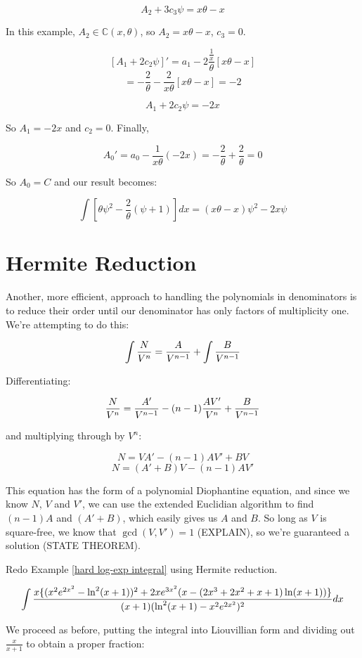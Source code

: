 $$A_2 + 3 c_3 \psi = x\theta - x$$

In this example, $A_2 \in {\mathbb C}(x,\theta)$, so $A_2 = x\theta -x$, $c_3=0$.

$$\left[ A_1 + 2 c_2 \psi \right]' = a_1 - 2 \frac{\frac{1}{x}}{\theta}[x\theta - x]$$
$$= -\frac{2}{\theta} - \frac{2}{x \theta}[x\theta - x] = -2$$

$$A_1 + 2 c_2 \psi = -2x$$

So $A_1 = -2x$ and $c_2 = 0$.  Finally,

$$A_0' = a_0 - \frac{1}{x \theta}(-2x) = -\frac{2}{\theta} + \frac{2}{\theta} = 0$$

So $A_0 = C$ and our result becomes:

$$\int \left[ \theta \psi^2 - \frac{2}{\theta}(\psi+1) \right] dx = (x\theta -x)\psi^2 - 2x \psi$$


\endexample

\vfill\eject

\section{Hermite Reduction}

Another, more efficient, approach to handling the polynomials in
denominators is to reduce their order until our denominator has only
factors of multiplicity one.  We're attempting to do this:

$$\int {N\over{V^n}} = {A\over{V^{n-1}}} + \int {B\over{V^{n-1}}}$$

Differentiating:

$${N\over{V^n}} = {A'\over{V^{n-1}}} - (n-1){AV'\over{V^n}} + {B\over{V^{n-1}}}$$

and multiplying through by $V^n$:

$$N = VA' - (n-1)AV' + BV$$
$$N = (A'+B)V - (n-1)AV'$$

This equation has the form of a polynomial Diophantine equation, and
since we know $N$, $V$ and $V'$, we can use the extended Euclidian
algorithm to find $(n-1)A$ and $(A'+B)$, which easily gives us $A$ and
$B$.  So long as $V$ is square-free, we know that $\gcd(V,V')=1$
(EXPLAIN), so we're guaranteed a solution (STATE THEOREM).

\example
Redo Example \ref{hard log-exp integral} using Hermite reduction.

$$\int{{x\{(x^2e^{2x^2}-\ln^2(x+1))^2+2xe^{3x^2}(x-(2x^3+2x^2+x+1)\ln(x+1))\}}\over{(x+1)(\ln^2(x+1) - x^2e^{2x^2})^2}} dx$$

We proceed as before, putting the integral into Liouvillian form
and dividing out $\frac{x}{x+1}$ to obtain a proper fraction:

